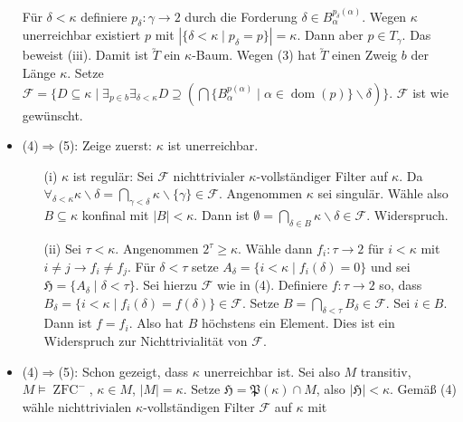 \documentclass[a4paper,fontsize=11pt]{scrartcl}
\newcommand{\ZFC}{\operatorname{ZFC}}
\newcommand{\dom}{\operatorname{dom}}
\begin{document}
\begin{itemize}
\begin{itemize}
      \end{itemize}
      Für $\delta<\kappa$ definiere $p_\delta:\gamma\rightarrow 2$
      durch die Forderung $\delta\in
      B_\alpha^{p_\delta(\alpha)}$. Wegen $\kappa$ unerreichbar
      existiert $p$ mit $|\{\delta<\kappa\mid p_\delta=p\}|=\kappa$. Dann
      aber $p\in T_\gamma$. Das beweist (iii). Damit ist $\utilde{T}$
      ein $\kappa$-Baum. \newline Wegen (3) hat $\utilde{T}$ einen
      Zweig $b$ der Länge $\kappa$. Setze
      $\mathcal{F}=\{D\subseteq\kappa\mid\exists_{p\in
        b}\exists_{\delta<\kappa}
      D\supseteq(\bigcap\{B_\alpha^{p(\alpha)}\mid
      \alpha\in\dom(p)\}\backslash\delta)\}$. $\mathcal{F}$ ist wie
      gewünscht.
    \item (4)$\Rightarrow$(5): Zeige zuerst: $\kappa$ ist
      unerreichbar.
      \begin{itemize}
      \item[(i)] $\kappa$ ist regulär: Sei $\mathcal{F}$
        nichttrivialer $\kappa$-vollständiger Filter auf $\kappa$. Da
        $\forall_{\delta<\kappa}\kappa\backslash\delta=
        \bigcap\limits_{\gamma<\delta}\kappa\backslash
        \{\gamma\}\in\mathcal{F}$. Angenommen $\kappa$ sei
        singulär. Wähle also $B\subseteq\kappa$ konfinal mit
        $|B|<\kappa$. Dann ist $\emptyset=\bigcap\limits_{\delta\in
          B}\kappa\backslash\delta\in\mathcal{F}$. Widerspruch.
      \item[(ii)] Sei $\tau<\kappa$. Angenommen
        $2^\tau\ge\kappa$. Wähle dann $f_i:\tau\rightarrow 2$ für
        $i<\kappa$ mit $i\neq j\rightarrow f_i\neq f_j$. Für
        $\delta<\tau$ setze $A_\delta=\{i<\kappa\mid f_i(\delta)=0\}$ und
        sei $\mathfrak{H}=\{A_\delta\mid\delta<\tau\}$. Sei hierzu
        $\mathcal{F}$ wie in (4). Definiere $f:\tau\rightarrow 2$ so,
        dass
        $B_\delta=\{i<\kappa\mid f_i(\delta)=f(\delta)\}\in\mathcal{F}$. Setze
        $B=\bigcap\limits_{\delta<\tau}B_\delta\in\mathcal{F}$. Sei
        $i\in B$. Dann ist $f=f_i$. Also hat $B$ höchstens ein
        Element. Dies ist ein Widerspruch zur Nichttrivialität von
        $\mathcal{F}$.
      \end{itemize}
    \item (4)$\Rightarrow$(5): Schon gezeigt, dass $\kappa$
      unerreichbar ist. Sei also $M$ transitiv, $M\models\ZFC^-$,
      $\kappa\in M$, $|M|=\kappa$. Setze
      $\mathfrak{H}=\mathfrak{P}(\kappa)\cap M$, also
      $|\mathfrak{H}|<\kappa$. Gemäß (4) wähle nichttrivialen
      $\kappa$-vollständigen Filter $\mathcal{F}$ auf $\kappa$ mit

\end{itemize}
\end{document}

